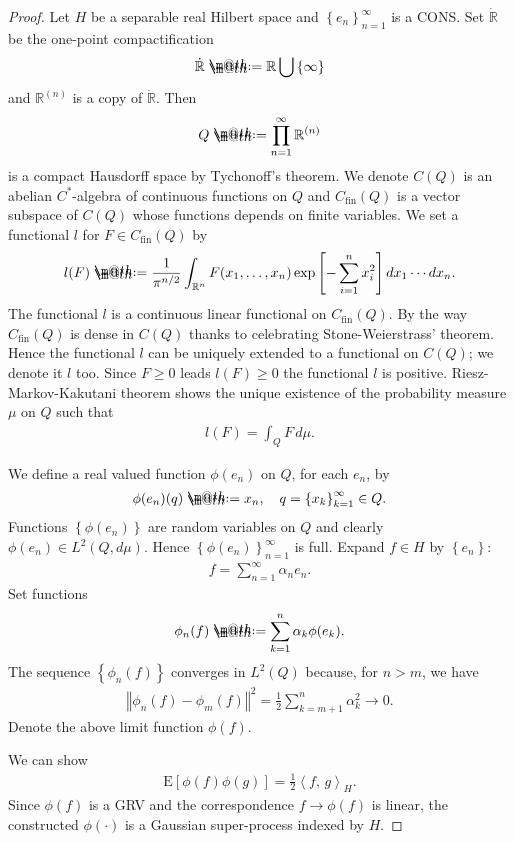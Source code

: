 \documentclass[openany, a4paper, oneside]{jsbook}
\makeatletter
\newcommand*{\defeq}{\mathrel{\rlap{%
\raisebox{0.3ex}{$\m@th\cdot$}}%
\raisebox{-0.3ex}{$\m@th\cdot$}}%
=}
\theoremstyle{break}
\theoremstyle{breakdefn}
\newcommand{\norm}[1]{\left\Vert#1\right\Vert}
\newcommand{\sqbk}[1]{\left[#1\right]}
\newcommand{\cbk}[1]{\left\{#1\right\}}
\newcommand{\bkt}[2]{\left\langle#1,\,#2\right\rangle}
\newcommand{\bbR}{\mathbb{R}}
\newcommand{\bbRn}{\mathbb{R}^n}
\newcommand{\E}[1]{\rmE\sqbk{#1}}
\newcommand{\rmE}{\mathrm{E}}
\makeatother
\begin{document}
\begin{proof}
 Let $H$ be a separable real Hilbert space and $\cbk{e_n}_{n=1}^{\infty}$ is a CONS.
 Set $\dot{\bbR}$ be the one-point compactification
  \begin{align}
   \dot{\bbR} \defeq \bbR \bigcup \cbk{\infty}
  \end{align}
 and $\bbR^{(n)}$ is a copy of $\dot{\bbR}$.
 Then
 \begin{align}
  Q
  \defeq
  \prod_{n=1}^{\infty} \bbR^{(n)}
 \end{align}
 is a compact Hausdorff space by Tychonoff's theorem.
 We denote $C (Q)$ is an abelian $C^*$-algebra of continuous functions on $Q$
 and $C_{\mathrm{fin}} (Q)$ is a vector subspace of $C (Q)$ whose functions depends on finite variables.
 We set a functional $l$ for $F \in C_{\mathrm{fin}} (Q)$ by
 \begin{align}
  l (F)
  \defeq
  \frac{1}{\pi^{n/2}} \int_{\bbRn} F (x_1, \dots, x_n) \exp \sqbk{- \sum_{i=1}^{n} x_i^2} dx_1 \cdots dx_n.
 \end{align}
 The functional $l$ is a continuous linear functional on $C_{\mathrm{fin}} (Q)$.
 By the way $C_{\mathrm{fin}} (Q)$ is dense in $C (Q)$ thanks to celebrating Stone-Weierstrass' theorem.
 Hence the functional $l$ can be uniquely extended to a functional on $C (Q)$; we denote it $l$ too.
 Since $F \geq 0$ leads $l (F) \geq 0$ the functional $l$ is positive.
 Riesz-Markov-Kakutani theorem shows the unique existence of the probability measure $\mu$ on $Q$ such that
 \begin{align}
  l (F)
  =
  \int_Q F \, d \mu.
 \end{align}

 We define a real valued function $\phi (e_n)$ on $Q$, for each $e_n$, by
 \begin{align}
  \phi (e_n) (q) \defeq x_n, \quad q = \cbk{x_k}_{k=1}^{\infty} \in Q.
 \end{align}
 Functions $\cbk{\phi (e_n)}$ are random variables on $Q$ and clearly $\phi (e_n) \in L^2 (Q, d \mu)$.
 Hence $\cbk{\phi (e_n)}_{n=1}^{\infty}$ is full.
 Expand $f \in H$ by $\cbk{e_n}$:
 \begin{align}
  f = \sum_{n=1}^{\infty} \alpha_n e_n.
 \end{align}
 Set functions
 \begin{align}
  \phi_n (f)
  \defeq
  \sum_{k=1}^{n} \alpha_k \phi (e_k).
 \end{align}
 The sequence $\cbk{\phi_n (f)}$ converges in $L^2 (Q)$ because, for $n > m$, we have
 \begin{align}
  \norm{\phi_n (f) - \phi_m (f)}^2
  =
  \frac{1}{2} \sum_{k = m+1}^{n} \alpha_k^2
  \to 0.
 \end{align}
 Denote the above limit function $\phi (f)$.

 We can show
 \begin{align}
  \E{\phi (f) \phi (g)} = \frac{1}{2} \bkt{f}{g}_{H}.
 \end{align}
 Since $\phi (f)$ is a GRV and the correspondence $f \to \phi (f)$ is linear,
 the constructed $\phi (\cdot)$ is a Gaussian super-process indexed by $H$.
\end{proof}
\end{document}
